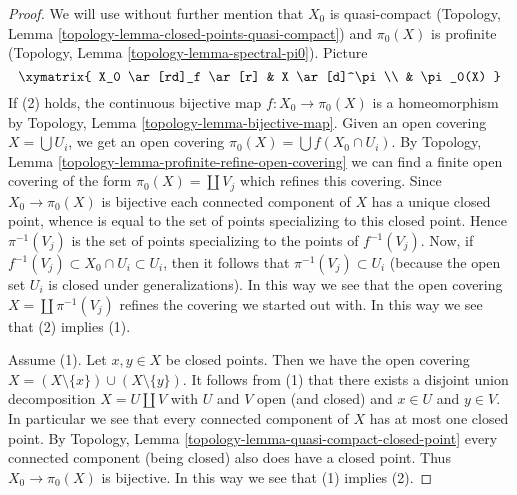 \begin{proof}
We will use without further mention that
$X_0$ is quasi-compact
(Topology, Lemma \ref{topology-lemma-closed-points-quasi-compact})
and $\pi_0(X)$ is profinite
(Topology, Lemma \ref{topology-lemma-spectral-pi0}).
Picture
$$
\xymatrix{
X_0 \ar[rd]_f \ar[r] & X \ar[d]^\pi \\
& \pi_0(X)
}
$$
If (2) holds, the continuous bijective map $f : X_0 \to \pi_0(X)$ is
a homeomorphism by
Topology, Lemma \ref{topology-lemma-bijective-map}.
Given an open covering $X = \bigcup U_i$, we get an open covering
$\pi_0(X) = \bigcup f(X_0 \cap U_i)$. By
Topology, Lemma \ref{topology-lemma-profinite-refine-open-covering}
we can find a finite open covering of the form $\pi_0(X) = \coprod V_j$
which refines this covering.
Since $X_0 \to \pi_0(X)$ is bijective each connected component of
$X$ has a unique closed point, whence is equal to the set of points
specializing to this closed point. Hence $\pi^{-1}(V_j)$ is the
set of points specializing to the points of $f^{-1}(V_j)$.
Now, if $f^{-1}(V_j) \subset X_0 \cap U_i \subset U_i$, then
it follows that $\pi^{-1}(V_j) \subset U_i$ (because the open set
$U_i$ is closed under generalizations). In this way we see
that the open covering $X = \coprod \pi^{-1}(V_j)$ refines
the covering we started out with. In this way we see that
(2) implies (1).

\medskip\noindent
Assume (1). Let $x, y \in X$ be closed points. Then we have the open covering
$X = (X \setminus \{x\}) \cup (X \setminus \{y\})$.
It follows from (1) that there exists a disjoint union decomposition
$X = U \amalg V$ with $U$ and $V$ open (and closed) and $x \in U$ and
$y \in V$. In particular we see that every connected component of $X$
has at most one closed point. By
Topology, Lemma \ref{topology-lemma-quasi-compact-closed-point}
every connected component (being closed) also does have a closed point.
Thus $X_0 \to \pi_0(X)$ is bijective. In this way we see that (1) implies (2).


\end{proof}
